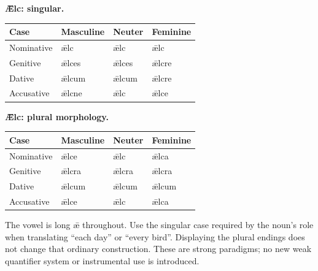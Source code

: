 \textbf{Ǣlc: singular.}

\par\begingroup
\fontsize{10.5}{13.2}\selectfont
\setlength{\LTleft}{0pt}\setlength{\LTright}{\fill}
\noindent
\begin{tabular}{@{}>{\raggedright\arraybackslash}p{22.0mm}>{\raggedright\arraybackslash}p{31.188mm}>{\raggedright\arraybackslash}p{31.188mm}>{\raggedright\arraybackslash}p{31.188mm}@{}}
\toprule
\textbf{Case} & \textbf{Masculine} & \textbf{Neuter} & \textbf{Feminine} \\
\midrule
Nominative & ǣlc & ǣlc & ǣlc \\
Genitive & ǣlces & ǣlces & ǣlcre \\
Dative & ǣlcum & ǣlcum & ǣlcre \\
Accusative & ǣlcne & ǣlc & ǣlce \\
\bottomrule
\end{tabular}
\par\endgroup
\textbf{Ǣlc: plural morphology.}

\par\begingroup
\fontsize{10.5}{13.2}\selectfont
\setlength{\LTleft}{0pt}\setlength{\LTright}{\fill}
\noindent
\begin{tabular}{@{}>{\raggedright\arraybackslash}p{22.0mm}>{\raggedright\arraybackslash}p{31.188mm}>{\raggedright\arraybackslash}p{31.188mm}>{\raggedright\arraybackslash}p{31.188mm}@{}}
\toprule
\textbf{Case} & \textbf{Masculine} & \textbf{Neuter} & \textbf{Feminine} \\
\midrule
Nominative & ǣlce & ǣlc & ǣlca \\
Genitive & ǣlcra & ǣlcra & ǣlcra \\
Dative & ǣlcum & ǣlcum & ǣlcum \\
Accusative & ǣlce & ǣlc & ǣlca \\
\bottomrule
\end{tabular}
\par\endgroup
The vowel is long ǣ throughout. Use the singular case required by the noun’s role when translating “each day” or “every bird”. Displaying the plural endings does not change that ordinary construction. These are strong paradigms; no new weak quantifier system or instrumental use is introduced.

